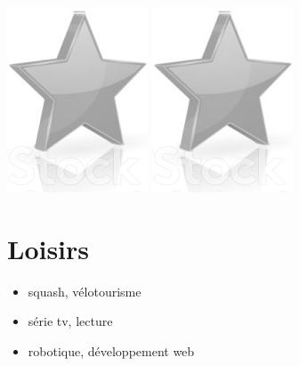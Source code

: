 \documentclass[10pt,a4paper,sans]{article}
\begin{document}
\begin{minipage}[t]{0.28\textwidth}
\begin{mdframed}[style=cadreCompetences]
\begin{itemize}
{                    \includegraphics[scale=0.20]{img/empty_star.png} \hspace{-0.2cm}
                    \includegraphics[scale=0.20]{img/empty_star.png}}
            \end{itemize}

        \section{Loisirs}
            \begin{itemize}
                \item{squash, vélotourisme}
                \item{série tv, lecture}
                \item{robotique, développement web}
            \end{itemize}
    \end{mdframed}
\end{minipage}
\hfill
\end{document}

